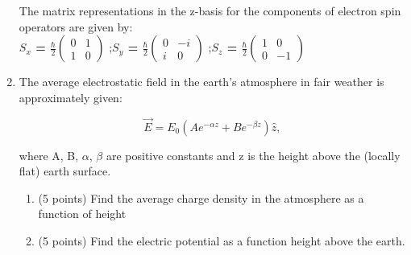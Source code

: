 \documentclass[12pt]{article}
\begin{document}
\begin{enumerate}
\begin{enumerate}
    

\end{enumerate}
The matrix representations in the z-basis for the components of electron spin operators are given by:\\

{\color{red}\bf{$S_{x}$} = $\frac{\hbar}{2}\begin{pmatrix} 0&1\\1&0\end{pmatrix}$}
{\color{purple};\hspace{1cm}\bf{$S_{y}$} = $\frac{\hbar}{2}\begin{pmatrix} 0&-\textit{i}\\\textit{i}&0\end{pmatrix}$}
{\color{orange};\hspace{1cm}\bf{$S_{z}$} = $\frac{\hbar}{2}\begin{pmatrix} 1&0\\0&-1\end{pmatrix}$}


\item The average electrostatic field in the earth’s atmosphere in fair weather is approximately given:


\begin{equation}
\vec{E} = E_{0}(Ae^{-\alpha z}+Be^{-\beta z})\hat{z}, 
\end{equation}

where A, B, $\alpha$, $\beta$ are positive constants and z is the height above the (locally flat) earth surface.
\begin{enumerate}
    \item (5 points) Find the average charge density in the atmosphere as a function of height\\
    \item (5 points) Find the electric potential as a function height above the earth.
\end{enumerate}

\end{enumerate}
\end{document}
